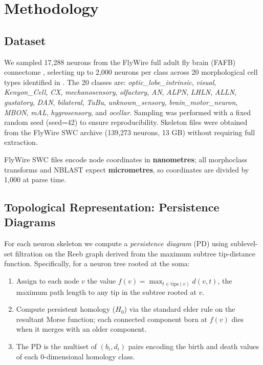 
\section{Methodology}

\subsection{Dataset}

We sampled 17,288 neurons from the FlyWire full adult fly brain (FAFB) connectome
\citep{schlegel2024whole}, selecting up to 2,000 neurons per class across 20
morphological cell types identified in \citet{malun2023flywire}.
The 20 classes are:
\textit{optic\_lobe\_intrinsic}, \textit{visual}, \textit{Kenyon\_Cell},
\textit{CX}, \textit{mechanosensory}, \textit{olfactory}, \textit{AN}, \textit{ALPN},
\textit{LHLN}, \textit{ALLN}, \textit{gustatory}, \textit{DAN}, \textit{bilateral},
\textit{TuBu}, \textit{unknown\_sensory}, \textit{brain\_motor\_neuron},
\textit{MBON}, \textit{mAL}, \textit{hygrosensory}, and \textit{ocellar}.
Sampling was performed with a fixed random seed (seed=42) to ensure reproducibility.
Skeleton files were obtained from the FlyWire SWC archive (139,273 neurons, 13 GB)
without requiring full extraction.

FlyWire SWC files encode node coordinates in \textbf{nanometres}; all morphoclass
transforms and NBLAST expect \textbf{micrometres}, so coordinates are divided by
1,000 at parse time.

\subsection{Topological Representation: Persistence Diagrams}

For each neuron skeleton we compute a \emph{persistence diagram} (PD) using
sublevel-set filtration on the Reeb graph derived from the maximum subtree
tip-distance function.  Specifically, for a neuron tree rooted at the soma:

\begin{enumerate}
  \item Assign to each node $v$ the value $f(v) = \max_{t \in \text{tips}(v)} d(v, t)$,
        the maximum path length to any tip in the subtree rooted at $v$.
  \item Compute persistent homology ($H_0$) via the standard elder rule on the
        resultant Morse function; each connected component born at $f(v)$ dies when
        it merges with an older component.
  \item The PD is the multiset of $(b_i, d_i)$ pairs encoding the birth and death
        values of each 0-dimensional homology class.
\end{enumerate}

